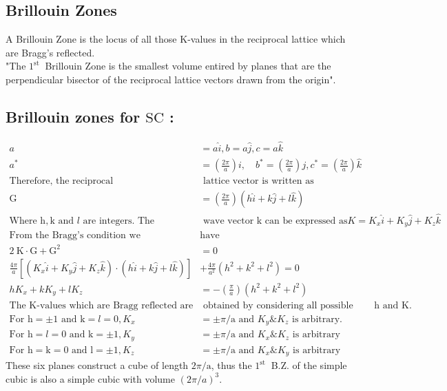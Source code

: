 \subsection{Brillouin Zones}
A Brillouin Zone is the locus of all those $\mathrm{K}$-values in the reciprocal lattice which are Bragg's reflected.\\
"The $1^{\text {st }}$ Brillouin Zone is the smallest volume entired by planes that are the perpendicular bisector of the reciprocal lattice vectors drawn from the origin".
\subsection{Brillouin zones for $\mathrm{SC}$ :}
\begin{align*}
a&=a \hat{i}, b=a \hat{j}, c=a \hat{k}\\
a^{*}&=\left(\frac{2 \pi}{a}\right) i, \quad b^{*}=\left(\frac{2 \pi}{a}\right) j, c^{*}=\left(\frac{2 \pi}{a}\right) \hat{k}\\
\text{Therefore, the reciprocal}&\text{ lattice vector is written as}\\
\mathrm{G}&=\left(\frac{2 \pi}{a}\right)(h \hat{i}+k \hat{j}+l \hat{k})\\
\text{Where $\mathrm{h}, \mathrm{k}$ and $l$ are integers. The }&\text{ wave vector $\mathrm{k}$ can be expressed as}
K=K_{x} \hat{i}+K_{y} \hat{j}+K_{z} \hat{k}\\
\text{From the Bragg's condition we }&\text{have} \\
2 \mathrm{~K} \cdot \mathrm{G}+\mathrm{G}^{2}&=0\\
\frac{4 \pi}{a}\left[\left(K_{x} \hat{i}+K_{y} \hat{j}+K_{z} \hat{k}\right) \cdot(h \hat{i}+k \hat{j}+l \hat{k})\right]&+\frac{4 \pi}{a^{2}}\left(h^{2}+k^{2}+l^{2}\right)=0\\
h K_{x}+k K_{y}+l K_{z}&=-\left(\frac{\pi}{a}\right)\left(h^{2}+k^{2}+l^{2}\right)\\
\text{The $\mathrm{K}$-values which are Bragg reflected are}&\text{ obtained by considering all possible combination of $\mathrm{h}$ and $\mathrm{K}$.}\\
\text{For $\mathrm{h}=\pm 1$ and $\mathrm{k}=l=0, K_{x}$}&\text{$=\pm \pi / \mathrm{a}$ and $K_{y} \& K_{z}$ is arbitrary.}\\
\text{For $\mathrm{h}=l=0$ and $\mathrm{k}=\pm 1, K_{y}$}&\text{$=\pm \pi / \mathrm{a}$ and $K_{x} \& K_{z}$ is arbitrary}\\
\text{For $\mathrm{h}=\mathrm{k}=0$ and $\mathrm{l}=\pm 1, K_{z}$}&\text{$=\pm \pi / \mathrm{a}$ and $K_{x} \& K_{y}$ is arbitrary}
\end{align*}
These six planes construct a cube of length $2 \pi / \mathrm{a}$, thus the $1^{\text {st }}$ B.Z. of the simple cubic is also a simple cubic with volume $(2 \pi / a)^{3}$. 
